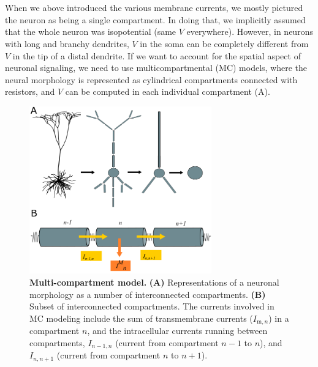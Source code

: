 \section{}
\label{sec:Neuron:morphology}
When we above introduced the various membrane currents, we mostly pictured the neuron as being a single compartment. In doing that, we implicitly assumed that the whole neuron was isopotential (same $V$ everywhere). However, in neurons with long and branchy dendrites, $V$ in the soma can be completely different from $V$ in the tip of a distal dendrite. If we want to account for the spatial aspect of neuronal signaling, we need to use multicompartmental (MC) models, where the neural morphology is represented as cylindrical compartments connected with resistors, and $V$ can be computed in each individual compartment (A). 

\begin{figure}[!ht]
\begin{center}
\includegraphics[width=0.7\textwidth]{Figures/Neuron/multikompis.png}
\end{center}
\caption{\textbf{Multi-compartment model.} {\bf (A)} Representations of a neuronal morphology as a number of interconnected compartments. {\bf (B)} Subset of interconnected compartments. The currents involved in MC modeling include the sum of transmembrane currents ($I_{\mathrm{m},n}$) in a compartment $n$, and the intracellular currents running between 
compartments, $I_{n-1,n}$ (current from compartment $n-1$ to $n$), and $I_{n,n+1}$ (current from compartment $n$ to $n+1$).
}
\label{fig:Neuron:multikompisen}
\end{figure}

